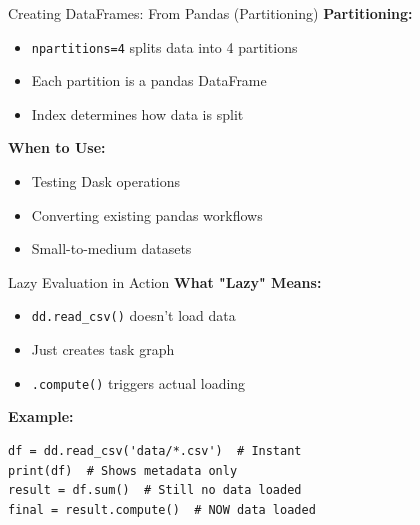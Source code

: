 \documentclass[aspectratio=169]{beamer}
\begin{document}
\begin{frame}{Creating DataFrames: From Pandas (Partitioning)}
\small
\textbf{Partitioning:}
\begin{itemize}
    \item \texttt{npartitions=4} splits data into 4 partitions
    \item Each partition is a pandas DataFrame
    \item Index determines how data is split
\end{itemize}

\vspace{0.2cm}
\textbf{When to Use:}
\begin{itemize}
    \item Testing Dask operations
    \item Converting existing pandas workflows
    \item Small-to-medium datasets
\end{itemize}
\end{frame}

\begin{frame}[fragile]{Lazy Evaluation in Action}
\small
\textbf{What "Lazy" Means:}
\begin{itemize}
    \item \texttt{dd.read\_csv()} doesn't load data
    \item Just creates task graph
    \item \texttt{.compute()} triggers actual loading
\end{itemize}

\vspace{0.1cm}
\textbf{Example:}
\begin{lstlisting}[basicstyle=\ttfamily\tiny]
df = dd.read_csv('data/*.csv')  # Instant
print(df)  # Shows metadata only
result = df.sum()  # Still no data loaded
final = result.compute()  # NOW data loaded
\end{lstlisting}
\end{frame}
\end{document}
